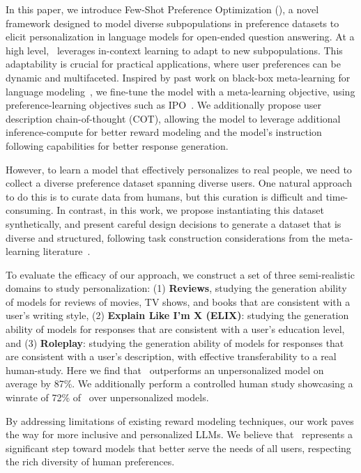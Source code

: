 In this paper, we introduce Few-Shot Preference Optimization  (\methodname{}), a novel framework designed to model diverse subpopulations in preference datasets to elicit personalization in language models for open-ended question answering. At a high level, \methodname\ leverages in-context learning to adapt to new subpopulations. This adaptability is crucial for practical applications, where user preferences can be dynamic and multifaceted. Inspired by past work on black-box meta-learning for language modeling~\citep{chen2022metalearninglanguagemodelincontext, min2022metaicllearninglearncontext, yu2024metamathbootstrapmathematicalquestions}, we fine-tune the model with a meta-learning objective, using preference-learning objectives such as IPO~\citep{2023arXiv231012036G}. We additionally propose user description chain-of-thought (COT), allowing the model to leverage additional inference-compute for better reward modeling and the model's instruction following capabilities for better response generation. 

However, to learn a model that effectively personalizes to real people, we need to collect a diverse preference dataset spanning diverse users. One natural approach to do this is to curate data from humans, but this curation is difficult and time-consuming. In contrast, in this work, we propose instantiating this dataset synthetically, and present careful design decisions to generate a dataset that is diverse and structured, following task construction considerations from the meta-learning literature~\citep{hsu2019unsupervised,yin2019meta}. 

To evaluate the efficacy of our approach, we construct a set of three semi-realistic domains to study personalization: (1) \textbf{Reviews}, studying the generation ability of models for reviews of movies, TV shows, and books that are consistent with a user’s writing style, (2) \textbf{Explain Like I'm X (ELIX)}: studying the generation ability of models for responses that are consistent with a user’s education level, and (3) \textbf{Roleplay}: studying the generation ability of models for responses that are consistent with a user's description, with effective transferability to a real human-study. Here we find that \methodname\ outperforms an unpersonalized model on average by 87\%. We additionally perform a controlled human study showcasing a winrate of 72\% of \methodname\ over unpersonalized models.


By addressing limitations of existing reward modeling techniques, our work paves the way for more inclusive and personalized LLMs. We believe that \methodname\ represents a significant step toward models that better serve the needs of all users, respecting the rich diversity of human preferences.